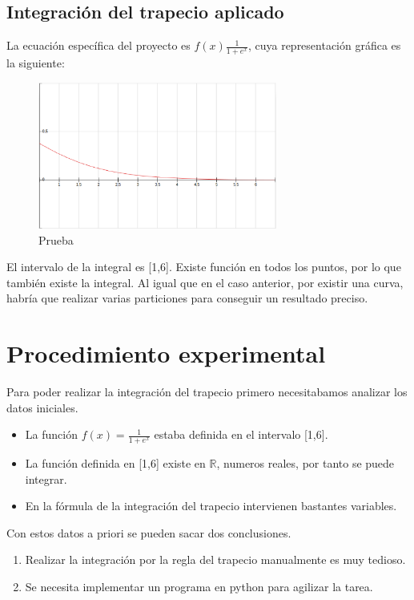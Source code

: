 \documentclass{article}
\begin{document}
    \subsection{Integración del trapecio aplicado}
      
    La ecuación específica del proyecto es $f(x)\frac{1}{1+e^x}$, cuya representación gráfica es la siguiente:
     
     \begin{figure}[h]
      \begin{center}
         \includegraphics[width=0.7\textwidth]{img4.eps}\caption{Prueba}\label{fig:grafica}
      \end{center}
     \end{figure}

      El intervalo de la integral es [1,6]. Existe función en todos los puntos, por lo que también existe la integral. Al igual que en el caso anterior, por existir una curva, habría que realizar varias particiones para conseguir un resultado preciso.

   \pagebreak



   \section{Procedimiento experimental}
   Para poder realizar la integración del trapecio primero necesitabamos analizar los datos iniciales.
   \begin{itemize}
    \item La función $f(x)=\frac{1}{1+e^x}$ estaba definida en el intervalo [1,6].
    \item La función definida en [1,6] existe en $\mathbb{R}$, numeros reales, por tanto se puede integrar.
    \item En la fórmula de la integración del trapecio intervienen bastantes variables.
   \end{itemize}
   Con estos datos a priori se pueden sacar dos conclusiones.
     \begin{enumerate}
       \item Realizar la integración por la regla del trapecio manualmente es muy tedioso.
       \item Se necesita implementar un programa en python para agilizar la tarea.
     \end{enumerate}
\end{document}
